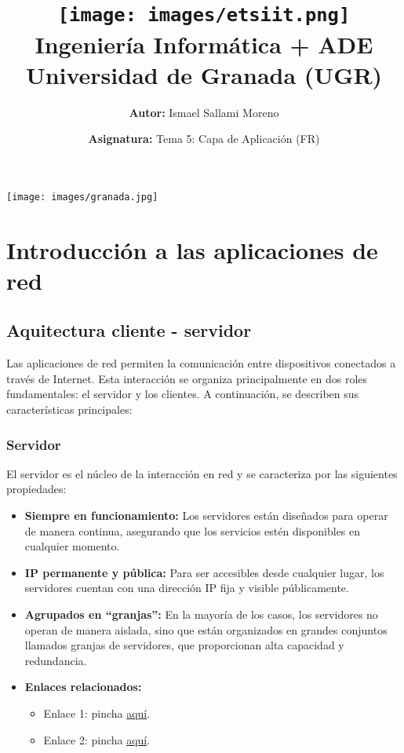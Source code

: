 \documentclass[a4paper,12pt]{article}
\title{
    \vspace{-2cm}
    \texttt{[image: images/etsiit.png]} \\ %
    \LARGE Ingeniería Informática + ADE\\
    \large Universidad de Granada (UGR)\\[1cm]
}
\author{\textbf{Autor:} Ismael Sallami Moreno}
\date{\textbf{Asignatura:} Tema 5: Capa de Aplicación (FR)\\[1cm]}
\begin{document}
\maketitle
\thispagestyle{empty}

\begin{center}
    \texttt{[image: images/granada.jpg]} \\ %
    \vfill
\end{center}

\newpage

\tableofcontents
\newpage

\section{Introducción a las aplicaciones de red}

\subsection{Aquitectura cliente - servidor}

Las aplicaciones de red permiten la comunicación entre dispositivos conectados a través de Internet. Esta interacción se organiza principalmente en dos roles fundamentales: el servidor y los clientes. A continuación, se describen sus características principales:

\subsubsection{Servidor}

El servidor es el núcleo de la interacción en red y se caracteriza por las siguientes propiedades:

\begin{itemize}
    \item \textbf{Siempre en funcionamiento:} Los servidores están diseñados para operar de manera continua, asegurando que los servicios estén disponibles en cualquier momento.
    \item \textbf{IP permanente y pública:} Para ser accesibles desde cualquier lugar, los servidores cuentan con una dirección IP fija y visible públicamente.
    \item \textbf{Agrupados en “granjas”:} En la mayoría de los casos, los servidores no operan de manera aislada, sino que están organizados en grandes conjuntos llamados granjas de servidores, que proporcionan alta capacidad y redundancia.
    \item \textbf{Enlaces relacionados:}
    \begin{itemize}
        \item Enlace 1: pincha \href{http://www.xatakandroid.com/mundo-android/la-imagen-de-la-semana-google-muestra-el-corazon-de-internet}{aquí}.
        \item Enlace 2: pincha \href{https://www.youtube.com/watch?v=zRwPSFpLX8I}{aquí}.
    \end{itemize}
\end{itemize}
\end{document}
